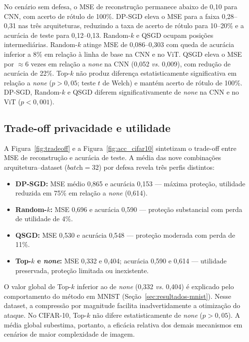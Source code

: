 \documentclass[kdmile,a4paper]{kdmile}
\begin{document}
No cen\'{a}rio sem defesa, o MSE de reconstru\c{c}\~{a}o permanece abaixo de 0,10 para CNN, com acerto de r\'{o}tulo de 100\%. DP-SGD eleva o MSE para a faixa 0,28--0,31 nas tr\^{e}s arquiteturas, reduzindo a taxa de acerto de r\'{o}tulo para 10--20\% e a acur\'{a}cia de teste para 0,12--0,13. Random-$k$ e QSGD ocupam posi\c{c}\~{o}es intermedi\'{a}rias. Random-$k$ atinge MSE de 0,086--0,303 com queda de acur\'{a}cia inferior a 8\% em rela\c{c}\~{a}o \`{a} linha de base na CNN e no ViT. QSGD eleva o MSE por $\approx$6 vezes em rela\c{c}\~{a}o a \textit{none} na CNN (0,052 \textit{vs.} 0,009), com redu\c{c}\~{a}o de acur\'{a}cia de 22\%. Top-$k$ n\~{a}o produz diferen\c{c}a estatisticamente significativa em rela\c{c}\~{a}o a \textit{none} ($p > 0{,}05$; teste $t$ de Welch) e mant\'{e}m acerto de r\'{o}tulo de 100\%. DP-SGD, Random-$k$ e QSGD diferem significativamente de \textit{none} na CNN e no ViT ($p < 0{,}001$).

\subsection{Trade-off privacidade e utilidade}

A Figura~\ref{fig:tradeoff} e a Figura~\ref{fig:acc_cifar10} sintetizam o trade-off entre MSE de reconstru\c{c}\~{a}o e acur\'{a}cia de teste. A m\'{e}dia das nove combina\c{c}\~{o}es arquitetura--dataset ($\textit{batch} = 32$) por defesa revela tr\^{e}s perfis distintos:

\begin{itemize}
\item \textbf{DP-SGD:} MSE m\'{e}dio 0,865 e acur\'{a}cia 0,153 --- m\'{a}xima prote\c{c}\~{a}o, utilidade reduzida em 75\% em rela\c{c}\~{a}o a \textit{none} (0,614).
\item \textbf{Random-$k$:} MSE 0,696 e acur\'{a}cia 0,590 --- prote\c{c}\~{a}o substancial com perda de utilidade de 4\%.
\item \textbf{QSGD:} MSE 0,530 e acur\'{a}cia 0,548 --- prote\c{c}\~{a}o moderada com perda de 11\%.
\item \textbf{Top-$k$ e \textit{none}:} MSE 0,332 e 0,404; acur\'{a}cia 0,590 e 0,614 --- utilidade preservada, prote\c{c}\~{a}o limitada ou inexistente.
\end{itemize}

O valor global de Top-$k$ inferior ao de \textit{none} (0,332 \textit{vs.} 0,404) \'{e} explicado pelo comportamento do m\'{e}todo em MNIST (Se\c{c}\~{a}o~\ref{sec:resultados-mnist}). Nesse dataset, a compress\~{a}o por magnitude facilita inadvertidamente a otimiza\c{c}\~{a}o do ataque. No CIFAR-10, Top-$k$ n\~{a}o difere estatisticamente de \textit{none} ($p > 0{,}05$). A m\'{e}dia global subestima, portanto, a efic\'{a}cia relativa dos demais mecanismos em cen\'{a}rios de maior complexidade de imagem.
\end{document}
